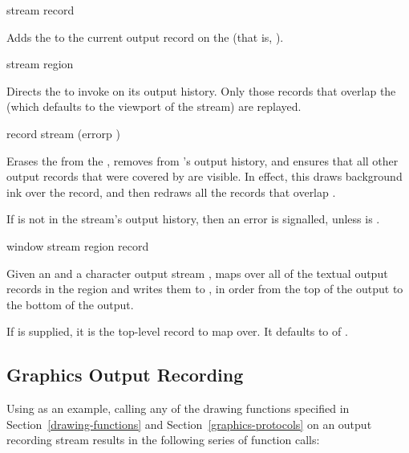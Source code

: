  {stream record}

Adds the   to the current output record on the
  (that is,
).

 {stream \optional region}

Directs the   to invoke 
on its output history.  Only those records that overlap the 
 (which defaults to the viewport of the stream) are replayed.

 {record stream \optional (errorp )}

Erases the   from the  , removes  from 's output history,
and ensures that all other output records that were covered by  are
visible.  In effect, this draws background ink over the record, and then redraws
all the records that overlap .

If  is not in the stream's output history, then an error is
signalled, unless  is .

 {window stream \optional region record}

Given an   and a character output
stream ,  maps over all of the
textual output records in the region  and writes them to
, in order from the top of the output to the bottom of the output.

If  is supplied, it is the top-level record to map over.  It
defaults to  of .


\subsection {Graphics Output Recording}

Using  as an example, calling any of the drawing functions
specified in Section~\ref{drawing-functions} and
Section~\ref{graphics-protocols} on an output recording stream results in the
following series of function calls:

